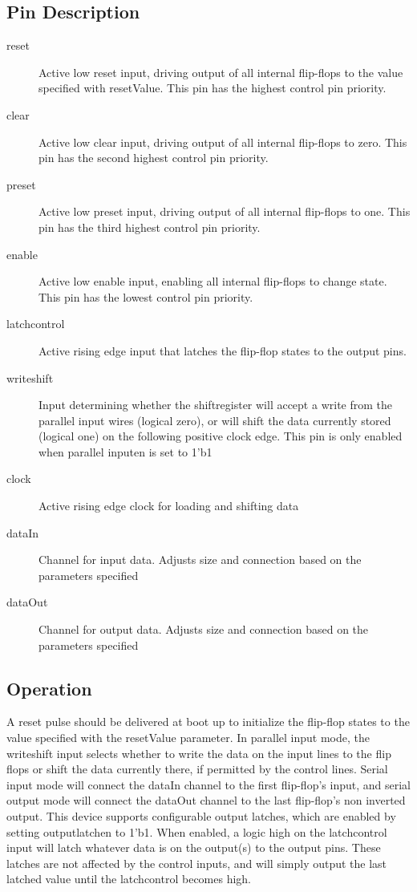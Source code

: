 \documentclass[11pt]{article}
\begin{document}
\subsection{Pin Description}
\begin{description}
	\item[reset]Active low reset input, driving output of all internal flip-flops to the value specified with resetValue. This pin has the highest control
		pin priority.
	\item[clear]Active low clear input, driving output of all internal flip-flops to zero. This pin has the second highest control pin priority.
	\item[preset]Active low preset input, driving output of all internal flip-flops to one. This pin has the third highest control pin priority.
	\item[enable]Active low enable input, enabling all internal flip-flops to change state. This pin has the lowest control pin priority.
	\item[latch\textunderscore control]Active rising edge input that latches the flip-flop states to the output pins.
	\item[write\textunderscore shift]Input determining whether the shift\textunderscore register will accept a write from the parallel input wires
		(logical zero), or will shift the data currently stored (logical one) on the following positive clock edge. This pin is only enabled when parallel
		\textunderscore input\textunderscore en is set to 1'b1
	\item[clock]Active rising edge clock for loading and shifting data
	\item[dataIn]Channel for input data. Adjusts size and connection based on the parameters specified
	\item[dataOut]Channel for output data. Adjusts size and connection based on the parameters specified
\end{description}
\subsection{Operation}
A reset pulse should be delivered at boot up to initialize the flip-flop states to the value specified with the resetValue parameter. In parallel input
mode, the write\textunderscore  shift input selects whether to write the data on the input lines to the flip flops or shift the data currently there, if
permitted by the control lines. Serial input mode will connect the dataIn channel to the first flip-flop's input, and serial output mode will connect the
dataOut channel to the last flip-flop's non inverted output.\hfill\break
This device supports configurable output latches, which are enabled by setting
output\textunderscore latch\textunderscore en to 1'b1. When enabled, a logic high on the latch\textunderscore control input will latch whatever data is
on the output(s) to the output pins. These latches are not affected by the control inputs, and will simply output the last latched value until the
latch\textunderscore control becomes high.
\end{document}

